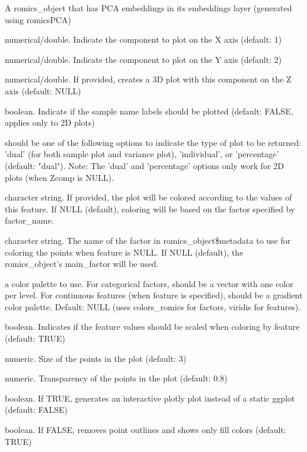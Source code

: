 \documentclass[a4paper]{book}
\begin{document}
%
\begin{Arguments}
\begin{ldescription}
\item[\code{romics\_object}] A romics\_object that has PCA embeddings in its embeddings layer (generated using romicsPCA)

\item[\code{Xcomp}] numerical/double. Indicate the component to plot on the X axis (default: 1)

\item[\code{Ycomp}] numerical/double. Indicate the component to plot on the Y axis (default: 2)

\item[\code{Zcomp}] numerical/double. If provided, creates a 3D plot with this component on the Z axis (default: NULL)

\item[\code{label}] boolean. Indicate if the sample name labels should be plotted (default: FALSE, applies only to 2D plots)

\item[\code{plot\_type}] should be one of the following options to indicate the type of plot to be returned:
'dual' (for both sample plot and variance plot), 'individual', or 'percentage' (default: "dual").
Note: The 'dual' and 'percentage' options only work for 2D plots (when Zcomp is NULL).

\item[\code{feature}] character string. If provided, the plot will be colored according to the values of this feature.
If NULL (default), coloring will be based on the factor specified by factor\_name.

\item[\code{factor\_name}] character string. The name of the factor in romics\_object\$metadata to use for coloring the points
when feature is NULL. If NULL (default), the romics\_object's main\_factor will be used.

\item[\code{color\_palette}] a color palette to use. For categorical factors, should be a vector with one color per level.
For continuous features (when feature is specified), should be a gradient color palette.
Default: NULL (uses colors\_romics for factors, viridis for features).

\item[\code{standardize}] boolean. Indicates if the feature values should be scaled when coloring by feature (default: TRUE)

\item[\code{size}] numeric. Size of the points in the plot (default: 3)

\item[\code{alpha}] numeric. Transparency of the points in the plot (default: 0.8)

\item[\code{plotly}] boolean. If TRUE, generates an interactive plotly plot instead of a static ggplot (default: FALSE)

\item[\code{show\_outline}] boolean. If FALSE, removes point outlines and shows only fill colors (default: TRUE)
\end{ldescription}
\end{Arguments}
\end{document}
